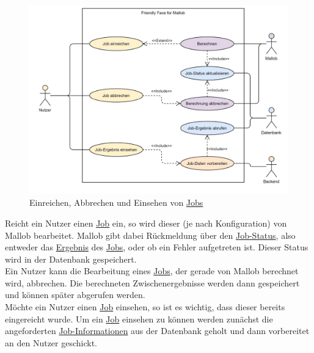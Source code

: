 \begin{figure}[H]
    \centering
    \includegraphics[width=\textwidth]{images-interface/usecasediagrams/Usecasediagram_Job-einreichen_Job-abbrechen-Job-Ergebnis-einsehen.jpg}
    \caption{Einreichen, Abbrechen und Einsehen von \hyperref[B:Jobs]{Jobs}}
\end{figure}

Reicht ein \gls{Nutzer} einen \hyperref[B:Jobs]{Job} ein, so wird dieser (je nach Konfiguration) von \gls{Mallob} bearbeitet. \gls{Mallob} gibt dabei Rückmeldung über den \hyperref[B:Job-Status]{Job-Status}, also entweder das \hyperref[B:Job-Ergebnis]{Ergebnis} des \hyperref[B:Jobs]{Jobs}, oder ob ein Fehler aufgetreten ist. Dieser Status wird in der \gls{Datenbank} gespeichert. \\
Ein \gls{Nutzer} kann die Bearbeitung eines \hyperref[B:Jobs]{Jobs}, der gerade von \gls{Mallob} berechnet wird, abbrechen. Die berechneten Zwischenergebnisse werden dann gespeichert und können später abgerufen werden. \\
Möchte ein \gls{Nutzer} einen \hyperref[B:Jobs]{Job} einsehen, so ist es wichtig, dass dieser bereits eingereicht wurde. Um ein \hyperref[B:Jobs]{Job} einsehen zu können werden zunächst die angeforderten \hyperref[B:Job-Informationen]{Job-Informationen} aus der \gls{Datenbank} geholt und dann vorbereitet an den \gls{Nutzer} geschickt.





